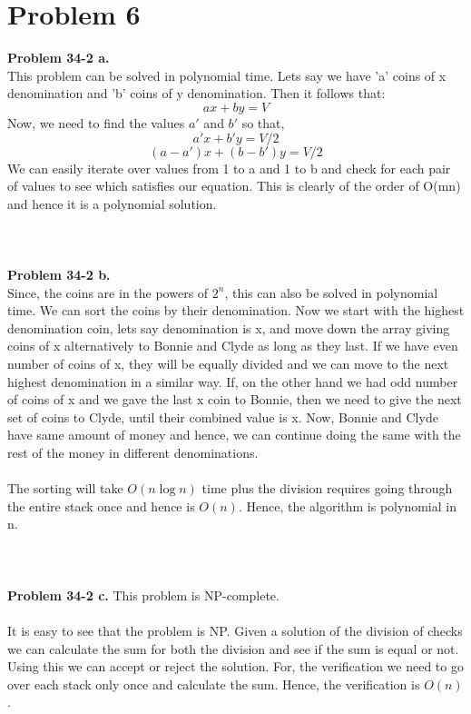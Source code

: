 \documentclass[10pt]{article}
\begin{document}
\section*{Problem 6}
\textbf{Problem 34-2 a.}\\
This problem can be solved in polynomial time. Lets say we have 'a' coins of x denomination and 'b' coins of y denomination. Then it follows that:
$$ax + by = V$$
Now, we need to find the values $a'$ and $b'$ so that,
$$a'x + b'y = V/2$$
$$(a-a')x + (b-b')y = V/2$$
We can easily iterate over values from 1 to a and 1 to b and check for each pair of values to see which satisfies our equation. This is clearly of the order of O(mn) and hence it is a polynomial solution.\\\\\\\\
\textbf{Problem 34-2 b.}\\
Since, the coins are in the powers of $2^n$, this can also be solved in polynomial time. We can sort the coins by their denomination. Now we start with the highest denomination coin, lets say denomination is x, and move down the array giving coins of x alternatively to Bonnie and Clyde as long as they last. If we have even number of coins of x, they will be equally divided and we can move to the next highest denomination in a similar way. If, on the other hand we had odd number of coins of x and we gave the last x coin to Bonnie, then we need to give the next set of coins to Clyde, until their combined value is x. Now, Bonnie and Clyde have same amount of money and hence, we can continue doing the same with the rest of the money in different denominations.\\\\
The sorting will take $O(n\log n)$ time plus the division requires going through the entire stack once and hence is $O(n)$. Hence, the algorithm is polynomial in n.\\\\\\\\
\textbf{Problem 34-2 c.}
This problem is NP-complete.\\\\
It is easy to see that the problem is NP. Given a solution of the division of checks we can calculate the sum for both the division and see if the sum is equal or not. Using this we can accept or reject the solution. For, the verification we need to go over each stack only once and calculate the sum. Hence, the verification is $O(n)$.\\\\
\end{document}
